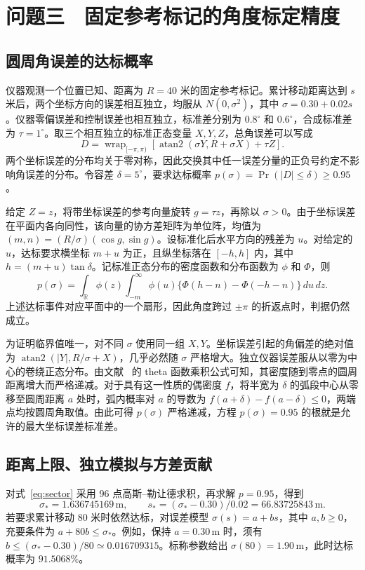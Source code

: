 \section{问题三　固定参考标记的角度标定精度}
\subsection{圆周角误差的达标概率}
仪器观测一个位置已知、距离为 \(R=40\) 米的固定参考标记。累计移动距离达到 \(s\) 米后，两个坐标方向的误差相互独立，均服从 \(N(0,\sigma^2)\)，其中 \(\sigma=0.30+0.02s\)。仪器零偏误差和控制误差也相互独立，标准差分别为 \(0.8^\circ\) 和 \(0.6^\circ\)，合成标准差为 \(\tau=1^\circ\)。取三个相互独立的标准正态变量 \(X,Y,Z\)，总角误差可以写成
\begin{equation}
 D=\operatorname{wrap}_{[-\pi,\pi)}\!\left[
 \operatorname{atan2}(\sigma Y,R+\sigma X)+\tau Z\right].
\end{equation}
两个坐标误差的分布均关于零对称，因此交换其中任一误差分量的正负号约定不影响角误差的分布。令容差 \(\delta=5^\circ\)，要求达标概率 \(p(\sigma)=\Pr(|D|\leq\delta)\geq0.95\)。

给定 \(Z=z\)，将带坐标误差的参考向量旋转 \(g=\tau z\)，再除以 \(\sigma>0\)。由于坐标误差在平面内各向同性，该向量的协方差矩阵为单位阵，均值为 \((m,n)=(R/\sigma)(\cos g,\sin g)\)。设标准化后水平方向的残差为 \(u\)。对给定的 \(u\)，达标要求横坐标 \(m+u\) 为正，且纵坐标落在 \([-h,h]\) 内，其中 \(h=(m+u)\tan\delta\)。记标准正态分布的密度函数和分布函数为 \(\phi\) 和 \(\Phi\)，则
\begin{equation}
 p(\sigma)=\int_{\mathbb R}\!\phi(z)
 \int_{-m}^{\infty}\!\phi(u)
 \{\Phi(h-n)-\Phi(-h-n)\}\,du\,dz .
 \label{eq:sector}
\end{equation}
上述达标事件对应平面中的一个扇形，因此角度跨过 \(\pm\pi\) 的折返点时，判据仍然成立。

为证明临界值唯一，对不同 \(\sigma\) 使用同一组 \(X,Y\)。坐标误差引起的角偏差的绝对值为 \(\operatorname{atan2}(|Y|,R/\sigma+X)\)，几乎必然随 \(\sigma\) 严格增大。独立仪器误差服从以零为中心的卷绕正态分布。由文献~\cite{theta} 的 theta 函数乘积公式可知，其密度随到零点的圆周距离增大而严格递减。对于具有这一性质的偶密度 \(f\)，将半宽为 \(\delta\) 的弧段中心从零移至圆周距离 \(a\) 处时，弧内概率对 \(a\) 的导数为 \(f(a+\delta)-f(a-\delta)\leq0\)，两端点均按圆周角取值。由此可得 \(p(\sigma)\) 严格递减，方程 \(p(\sigma)=0.95\) 的根就是允许的最大坐标误差标准差。

\clearpage
\subsection{距离上限、独立模拟与方差贡献}
对式~\eqref{eq:sector} 采用 96 点高斯--勒让德求积，再求解 \(p=0.95\)，得到
\begin{equation}
 \sigma_* = 1.636745169\,\mathrm m,\qquad
 s_*=(\sigma_*-0.30)/0.02=66.83725843\,\mathrm m .
\end{equation}
若要求累计移动 80 米时依然达标，对误差模型 \(\sigma(s)=a+bs\)，其中 \(a,b\geq0\)，充要条件为 \(a+80b\leq\sigma_*\)。例如，保持 \(a=0.30\,\mathrm m\) 时，须有 \(b\leq(\sigma_*-0.30)/80\simeq0.016709315\)。标称参数给出 \(\sigma(80)=1.90\,\mathrm m\)，此时达标概率为 \(91.5068\%\)。

